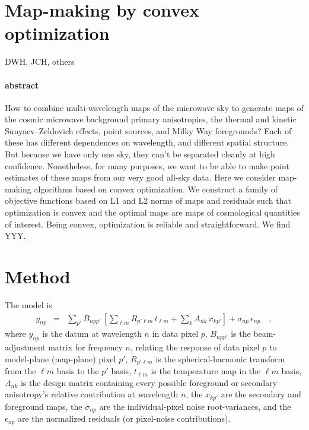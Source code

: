 \documentclass[11pt]{article}
\begin{document}
\section*{Map-making by convex optimization}

\noindent
DWH, JCH, others

\paragraph{abstract}
How to combine multi-wavelength maps of the microwave sky to generate
maps of the cosmic microwave background primary anisotropies, the
thermal and kinetic Sunyaev--Zeldovich effects, point sources, and
Milky Way foregrounds?
Each of these has different dependences on wavelength, and different
spatial structure.
But because we have only one sky, they can't be separated cleanly at
high confidence.
Nonetheless, for many purposes, we want to be able to make point
estimates of these maps from our very good all-sky data.
Here we consider map-making algorithms based on convex optimization.
We construct a family of objective functions based on L1 and L2 norms
of maps and residuals such that optimization is convex and the optimal
maps are maps of cosmological quantities of interest.
Being convex, optimization is reliable and straightforward.
We find YYY.

\section{Method}

The model is
\begin{eqnarray}
  y_{np} &=& \sum_{p'} B_{npp'}\,\left[
      \sum_{\ell m} R_{p'\ell m}\,t_{\ell m}
    + \sum_{k} A_{nk}\,x_{kp'}\right] + \sigma_{np}\,\epsilon_{np} \quad ,
\end{eqnarray}
where $y_{np}$ is the datum at wavelength $n$ in data pixel $p$,
$B_{npp'}$ is the beam-adjustment matrix for frequency $n$, relating the response of data
pixel $p$ to model-plane (map-plane) pixel $p'$, $R_{p'\ell m}$ is the
spherical-harmonic transform from the $\ell m$ basis to the $p'$
basis, $t_{\ell m}$ is the temperature map in the $\ell m$ basis,
$A_{nk}$ is the design matrix containing every possible foreground or
secondary anisotropy's relative contribution at wavelength $n$, the
$x_{kp'}$ are the secondary and foreground maps, the $\sigma_{np}$ are
the individual-pixel noise root-variances, and the $\epsilon_{np}$ are
the normalized residuals (or pixel-noise contributions).
\end{document}
